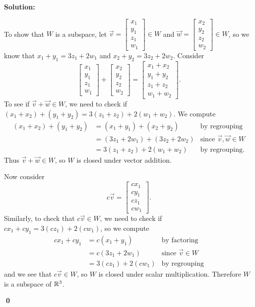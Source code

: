 \documentclass{article}
\newenvironment{solution}
{
  \ignorespaces
  \textbf{Solution:}
}
{
  \ignorespacesafterend
  \begin{flushright}
  {\bfseries \qed}
  \end{flushright}
}
\begin{document}
\begin{solution}

To show that \(W\) is a subspace, let
\(
  \vec v=\begin{bmatrix} x_1 \\y_1 \\ z_1 \\ w_1 \end{bmatrix}\in W
\) and
\(
  \vec w=\begin{bmatrix} x_2 \\y_2 \\ z_2 \\ w_2 \end{bmatrix} \in W
\),
so we know that \(x_1+y_1=3z_1+2w_1\) and \(x_2+y_2=3z_2+2w_2\).
Consider
\[
\begin{bmatrix} x_1 \\y_1 \\ z_1 \\ w_1\end{bmatrix}
+\begin{bmatrix} x_2 \\y_2 \\ z_2 \\ w_2 \end{bmatrix}
=\begin{bmatrix} x_1+x_2 \\y_1+y_2 \\ z_1+z_2 \\w_1+w_2 \end{bmatrix}
.\]
To see if \(\vec{v}+\vec{w} \in W\), we need to check if \( (x_1+x_2)+(y_1+y_2) = 3(z_1+z_2)+2(w_1+w_2)\).
We compute
  \begin{align*}
  (x_1+x_2)+(y_1+y_2) &= (x_1+y_1)+(x_2+y_2) &\text{by regrouping} \\
  &= (3z_1+2w_1)+(3z_2+2w_2) & \text{since \(\vec{v},\vec{w} \in W\)} \\
  &=3(z_1+z_2)+2(w_1+w_2) & \text{by regrouping.}
  \end{align*}
Thus \(\vec v+\vec w\in W\), so \(W\) is closed under vector addition.

Now consider
\[
c\vec v
=\begin{bmatrix} cx_1 \\cy_1 \\ cz_1 \\ cw_1 \end{bmatrix}
.\]
Similarly, to check that \(c\vec{v} \in W\), we need to check if \(cx_1+cy_1=3(cz_1)+2(cw_1)\), so we compute
\begin{align*}
cx_1+cy_1 & = c(x_1+y_1) &\text{by factoring} \\
&=c(3z_1+2w_1) &\text{since \(\vec{v} \in W\)}\\
&=3(cz_1)+2(cw_1) &\text{by regrouping}
\end{align*}
and we see that \(c\vec v\in W\), so \(W\) is closed under scalar 
multiplication. Therefore \(W\) is a subspace of \(\mathbb{R}^3\).


\end{solution}
\end{document}
